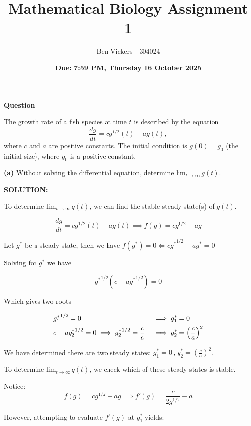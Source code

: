 \documentclass[]{article}
\title{\textbf{Mathematical Biology Assignment 1}}
\author{Ben Vickers - 304024}
\date{\textbf{Due: 7:59 PM, Thursday 16 October 2025}}
\begin{document}
	
	\maketitle
\noindent \textbf{Question}

\vspace{1em}

The growth rate of a fish species at time $t$ is described by the equation
\[
\frac{dg}{dt} = c g^{1/2}(t) - a g(t),
\]
\indent where $c$ and $a$ are positive constants. The initial condition is $g(0) = g_0$ (the \indent initial size), where $g_0$ is a positive constant.\newline

\noindent \textbf{(a)} Without solving the differential equation, determine lim$_{t\to \infty}\, g(t) $.\newline

\noindent \textbf{SOLUTION:}\newline

To determine lim$_{t\to \infty}\, g(t) $, we can find the stable steady state(s) of $g(t)$.

\[
\frac{dg}{dt} = c g^{1/2}(t) - a g(t) \implies f(g) =c g^{1/2} - a g 
\]

Let $g^*$ be a steady state, then we have $f(g^*) = 0 \iff c {g^*}^{1/2} - a g^* =0 $ 

Solving for $g^*$ we have:

\[
{g^*}^{1/2} \left(c - a {g^*}^{1/2}\right) = 0
\]

Which gives two roots:

\[
\begin{aligned}
\displaystyle &{g^*_1}^{1/2} = 0 &&\implies \displaystyle g^*_1 = 0 \\
\displaystyle &c - a {g^*_2}^{1/2} = 0 \implies \displaystyle {g^*_2}^{1/2} = \frac{c}{a} &&\implies \displaystyle g^*_2 = \left(\frac{c}{a}\right)^2
\end{aligned}
\]

We have determined there are two steady states: $g^*_1 = 0\, , \, g^*_2 = \left(\frac{c}{a}\right)^2$. \newline

To determine lim$_{t\to \infty}\, g(t) $, we check which of these steady states is stable.\newline

Notice:
\[
f(g) =c g^{1/2} - a g  \implies f'(g) = \frac{c}{2g^{1/2}} - a
\]

However, attempting to evaluate $f'(g)$ at $g^*_1$ yields:
\end{document}
